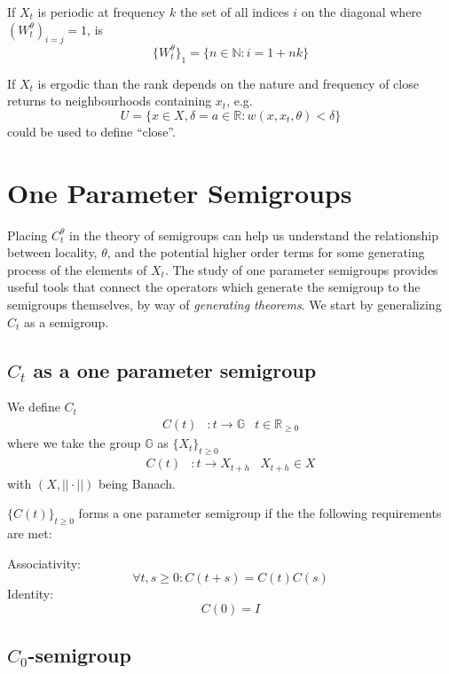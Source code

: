 \documentclass{article}
\newcommand{\N}{\mathbb{N}}
\newcommand{\R}{\mathbb{R}}
\newcommand{\G}{\mathbb{G}}
\begin{document}
If $X_t$ is periodic at frequency $k$ the set of all indices $i$ on the diagonal where $(W_t^\theta)_{i=j} = 1$, is 
$$ 
    \{W_t^\theta\}_1 = \{n\in\N: i = 1+nk \}
$$

If $X_t$ is ergodic than the rank depends on the nature and frequency of close returns to neighbourhoods containing $x_t$, e.g. 
$$
    U = \{x\in X, \delta = a \in \R: w(x, x_t, \theta) < \delta \}
$$ 
could be used to define ``close''.

\section{One Parameter Semigroups}
Placing $C_t^\theta$ in the theory of semigroups can help us understand the relationship between locality, $\theta$, and the potential higher order terms for some generating process of the elements of $X_t$. The study of one parameter semigroups provides useful tools that connect the operators which generate the semigroup to the semigroups themselves, by way of \textit{generating theorems}. We start by generalizing $C_t$ as a semigroup.

\subsection{$C_t$ as a one parameter semigroup}

We define $C_t$
\begin{align*}
    C(t)&: t \rightarrow \G \nonumber &t\in\R_{\geq0}
\end{align*}
where we take the group $\G$ as $\{X_t\}_{t\geq0}$ 
\begin{align*}
    C(t)&: t \rightarrow X_{t+h} \nonumber &X_{t+h}\in X
\end{align*}
with $(X, ||\cdot||)$ being Banach. 

$\{C(t)\}_{t\geq 0}$ forms a one parameter semigroup if the the following requirements are met:

\qquad Associativity:
\begin{equation}
    \forall t,s\geq0: C(t+s) = C(t)C(s) \label{eq:associativity}
\end{equation}
\qquad Identity: 
\begin{equation}
    C(0) = I \label{eq:identity}
\end{equation}

\subsection{$C_0$-semigroup}
\end{document}
